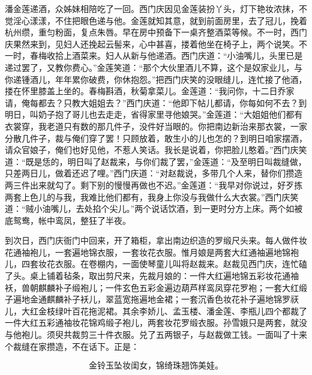 潘金莲递酒，众姊妹相陪吃了一回。西门庆因见金莲装扮丫头，灯下艳妆浓抹，不觉淫心漾漾，不住把眼色递与他。金莲就知其意，就到前面房里，去了冠儿，挽着杭州缵，重匀粉面，复点朱唇。早在房中预备下一桌齐整酒菜等候。不一时，西门庆果然来到，见妇人还挽起云髻来，心中甚喜，搂着他坐在椅子上，两个说笑。不一时，春梅收拾上酒菜来。妇人从新与他递酒。西门庆道：“小油嘴儿，头里已是递过罢了，又教你费心。”金莲笑道：“那个大伙里酒儿不算，这个是奴家业儿，与你递锺酒儿，年年累你破费，你休抱怨。”把西门庆笑的没眼缝儿，连忙接了他酒，搂在怀里膝盖上坐的。春梅斟酒，秋菊拿菜儿。金莲道：“我问你，十二日乔家请，俺每都去？只教大姐姐去？”西门庆道：“他即下帖儿都请，你每如何不去？到明日，叫奶子抱了哥儿也去走走，省得家里寻他娘哭。”金莲道：“大姐姐他们都有衣裳穿，我老道只有数的那几件子，没件好当眼的。你把南边新治来那衣裳，一家分散几件子，裁与俺们穿了罢！只顾放着，敢生小的儿也怎的？到明日咱家摆酒，请众官娘子，俺们也好见他，不惹人笑话。我长是说着，你把脸儿憨着。”西门庆笑道：“既是恁的，明日叫了赵裁来，与你们裁了罢，”金莲道：“及至明日叫裁缝做，只差两日儿，做着还迟了哩。”西门庆道：“对赵裁说，多带几个人来，替你们攒造两三件出来就勾了。剩下别的慢慢再做也不迟。”金莲道：“我早对你说过，好歹拣两套上色儿的与我，我难比他们都有，我身上你没与我做什么大衣裳。”西门庆笑道：“贼小油嘴儿，去处掐个尖儿。”两个说话饮酒，到一更时分方上床。两个如被底鸳鸯，帐中鸾凤，整狂了半夜。

到次日，西门庆衙门中回来，开了箱柜，拿出南边织造的罗缎尺头来。每人做件妆花通袖袍儿，一套遍地锦衣服，一套妆花衣服。惟月娘是两套大红通袖遍地锦袍儿，四套妆花衣服。在卷棚内，一面使琴童儿叫将赵裁来。赵裁见西门庆，连忙磕了头。桌上铺着毡条，取出剪尺来，先裁月娘的：一件大红遍地锦五彩妆花通袖袄，兽朝麒麟补子缎袍儿；一件玄色五彩金遍边葫芦样鸾凤穿花罗袍；一套大红缎子遍地金通麒麟补子袄儿，翠蓝宽拖遍地金裙；一套沉香色妆花补子遍地锦罗祆儿，大红金枝绿叶百花拖泥裙。其余李娇儿、孟玉楼、潘金莲、李瓶儿四个都裁了一件大红五彩通袖妆花锦鸡缎子袍儿，两套妆花罗缎衣服。孙雪娥只是两套，就没与他袍儿。须臾共裁剪三十件衣服。兑了五两银子，与赵裁做工钱。一面叫了十来个裁缝在家攒造，不在话下。正是：

\[
金铃玉坠妆闺女，锦绮珠翘饰美娃。
\]
